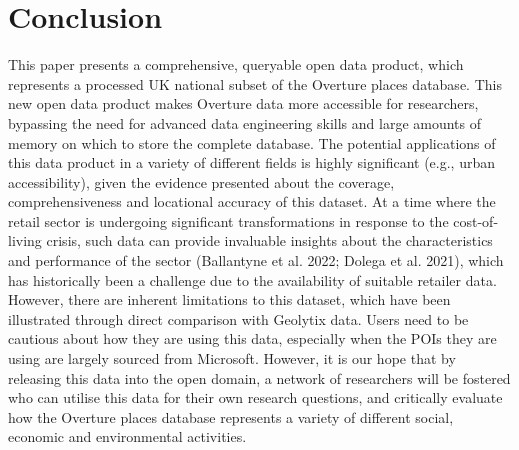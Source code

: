 \documentclass[
]{article}
\begin{document}
\begin{figure}


\caption{\label{fig-figure1}}

\end{figure}%

\section{Conclusion}\label{conclusion}

This paper presents a comprehensive, queryable open data product, which
represents a processed UK national subset of the Overture places
database. This new open data product makes Overture data more accessible
for researchers, bypassing the need for advanced data engineering skills
and large amounts of memory on which to store the complete database. The
potential applications of this data product in a variety of different
fields is highly significant (e.g., urban accessibility), given the
evidence presented about the coverage, comprehensiveness and locational
accuracy of this dataset. At a time where the retail sector is
undergoing significant transformations in response to the cost-of-living
crisis, such data can provide invaluable insights about the
characteristics and performance of the sector (Ballantyne et al. 2022;
Dolega et al. 2021), which has historically been a challenge due to the
availability of suitable retailer data. However, there are inherent
limitations to this dataset, which have been illustrated through direct
comparison with Geolytix data. Users need to be cautious about how they
are using this data, especially when the POIs they are using are largely
sourced from Microsoft. However, it is our hope that by releasing this
data into the open domain, a network of researchers will be fostered who
can utilise this data for their own research questions, and critically
evaluate how the Overture places database represents a variety of
different social, economic and environmental activities.
\end{document}

